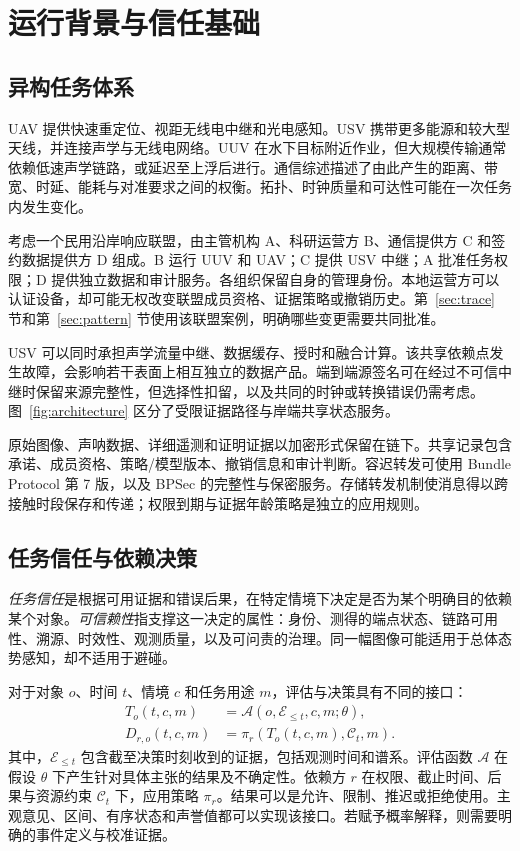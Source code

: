\section{运行背景与信任基础}
\subsection{异构任务体系}\label{sec:coalition}

UAV 提供快速重定位、视距无线电中继和光电感知。USV 携带更多能源和较大型天线，并连接声学与无线电网络。UUV 在水下目标附近作业，但大规模传输通常依赖低速声学链路，或延迟至上浮后进行。通信综述描述了由此产生的距离、带宽、时延、能耗与对准要求之间的权衡\citep{nomikos2023survey,ali2020recent,saeed2019underwater,jahanbakht2021internet}。拓扑、时钟质量和可达性可能在一次任务内发生变化。

考虑一个民用沿岸响应联盟，由主管机构 A、科研运营方 B、通信提供方 C 和签约数据提供方 D 组成。B 运行 UUV 和 UAV；C 提供 USV 中继；A 批准任务权限；D 提供独立数据和审计服务。各组织保留自身的管理身份。本地运营方可以认证设备，却可能无权改变联盟成员资格、证据策略或撤销历史。第~\ref{sec:trace} 节和第~\ref{sec:pattern} 节使用该联盟案例，明确哪些变更需要共同批准。

USV 可以同时承担声学流量中继、数据缓存、授时和融合计算。该共享依赖点发生故障，会影响若干表面上相互独立的数据产品。端到端源签名可在经过不可信中继时保留来源完整性，但选择性扣留，以及共同的时钟或转换错误仍需考虑。图~\ref{fig:architecture} 区分了受限证据路径与岸端共享状态服务。

原始图像、声呐数据、详细遥测和证明证据以加密形式保留在链下。共享记录包含承诺、成员资格、策略/模型版本、撤销信息和审计判断。容迟转发可使用 Bundle Protocol 第 7 版，以及 BPSec 的完整性与保密服务\citep{rfc9171,rfc9172}。存储转发机制使消息得以跨接触时段保存和传递；权限到期与证据年龄策略是独立的应用规则。

\subsection{任务信任与依赖决策}

\emph{任务信任}是根据可用证据和错误后果，在特定情境下决定是否为某个明确目的依赖某个对象。\emph{可信赖性}指支撑这一决定的属性：身份、测得的端点状态、链路可用性、溯源、时效性、观测质量，以及可问责的治理。同一幅图像可能适用于总体态势感知，却不适用于避碰。

对于对象 $o$、时间 $t$、情境 $c$ 和任务用途 $m$，评估与决策具有不同的接口：
\begin{equation}\begin{aligned}
T_o(t,c,m)&=\mathcal{A}(o,\mathcal{E}_{\leq t},c,m;\theta),\\
D_{r,o}(t,c,m)&=\pi_r\!\left(T_o(t,c,m),\mathcal{C}_t,m\right).
\end{aligned}\label{eq:trust}\end{equation}
其中，$\mathcal{E}_{\leq t}$ 包含截至决策时刻收到的证据，包括观测时间和谱系。评估函数 $\mathcal{A}$ 在假设 $\theta$ 下产生针对具体主张的结果及不确定性。依赖方 $r$ 在权限、截止时间、后果与资源约束 $\mathcal{C}_t$ 下，应用策略 $\pi_r$。结果可以是允许、限制、推迟或拒绝使用。主观意见、区间、有序状态和声誉值都可以实现该接口\citep{jsang2016subjective,mui2003computational,kamvar2003eigentrust}。若赋予概率解释，则需要明确的事件定义与校准证据。

